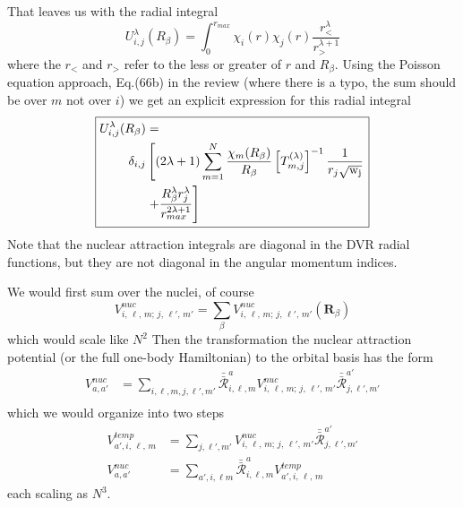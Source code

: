 \documentclass[%
pra%
,twocolumn%
,amssymb, nobibnotes, aps,
longbibliography
]{revtex4-1}
\begin{document}
That leaves us with the radial integral 
\begin{equation}
U^\lambda_{i,j}(R_\beta) = \int_0^{r_{max}} \chi_{i}(r) \chi_{j}(r) 
\frac{r_<^\lambda}{r_>^{\lambda+1}} 
\end{equation}
where the $r_<$ and $r_>$  refer to the less or greater of $r$ and $R_\beta$.
Using the Poisson equation approach, Eq.(66b) in the review \cite{TopicalReview2004}
(where there is a typo, the sum should be over $m$ not over $i$)
we get an explicit expression for this radial integral
\begin{equation}
\boxed{
\begin{aligned}
U^\lambda_{i,j}(R_\beta) & =  \\
\delta_{i,j}
& \left[
(2 \lambda +1) \sum_{m=1}^N 
\frac{\chi_m(R_\beta)}{R_\beta}
\left[ T^{(\lambda)}_{m,j}\right]^{-1} 
\frac{1}{r_{j}\sqrt{\rm{w}_{j}}} 
 \right. \\
& \left.  
 + \frac{R_\beta^{\lambda} r_{j}^\lambda }{r_{max}^{2\lambda+1}} 
\right]
\end{aligned}
}
\end{equation}
Note that the nuclear attraction integrals are diagonal in the 
DVR radial functions, but they are not diagonal in the angular momentum
indices.  

We would first sum over the nuclei, of course
\begin{equation}
 V^{nuc}_{i, \, \ell, \,m; \, j, \,\ell', \, m'} = \sum_\beta V^{nuc}_{i, \, \ell, \,m; \, j, \,\ell', \, m'}(\mathbf{R}_\beta) 
\end{equation}
which would scale like $N^2$
Then the transformation the nuclear attraction potential (or the full one-body Hamiltonian) to the orbital basis
has the form
\begin{equation}
\begin{split}
V^{nuc}_{a,a'} &=  \sum_{i,\ell,m,j,\ell',m'} \bar{\bar{{\mathcal{R}}}}_{i,\ell,m}^a  V^{nuc}_{i, \, \ell, \,m; \, j, \,\ell', \, m'} \bar{\bar{{\mathcal{R}}}}_{j,\ell',m'}^{a'}\\
\end{split}
\end{equation}
which we would organize into two steps
\begin{equation}
\begin{split}
V^{temp}_{a',i, \, \ell, \,m}&=  \sum_{j,\ell',m'} V^{nuc}_{i, \, \ell, \,m; \, j, \,\ell', \, m'}  \bar{\bar{{\mathcal{R}}}}_{j,\ell',m'}^{a'}\\
V^{nuc}_{a,a'} &=  \sum_{a',i,\ell m} \bar{\bar{{\mathcal{R}}}}_{i,\ell,m}^a   V^{temp}_{a',i, \, \ell, \,m}\
\end{split}
\end{equation}
each scaling as $N^3$.
\end{document}
